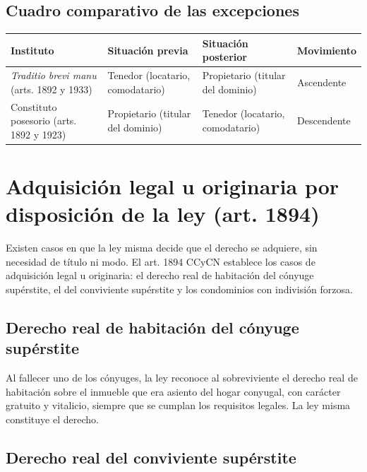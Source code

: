 \documentclass[12pt,oneside]{book}
\begin{document}
\subsection{Cuadro comparativo de las excepciones}

\begin{center}
\small
\renewcommand{\arraystretch}{1.3}
\begin{tabularx}{\textwidth}{@{}>{\raggedright\arraybackslash}p{}>{\raggedright\arraybackslash}X>{\raggedright\arraybackslash}X>{\raggedright\arraybackslash}p{}@{}}
\toprule
\textbf{Instituto} & \textbf{Situación previa} & \textbf{Situación posterior} & \textbf{Movimiento} \\
\midrule
\textit{Traditio brevi manu} (arts. 1892 y 1933) & Tenedor (locatario, comodatario) & Propietario (titular del dominio) & Ascendente \\
Constituto posesorio (arts. 1892 y 1923) & Propietario (titular del dominio) & Tenedor (locatario, comodatario) & Descendente \\
\bottomrule
\end{tabularx}
\end{center}

\section{Adquisición legal u originaria por disposición de la ley (art. 1894)}

Existen casos en que la ley misma decide que el derecho se adquiere, sin necesidad de título ni modo. El art. 1894 CCyCN establece los casos de adquisición legal u originaria: el derecho real de habitación del cónyuge supérstite, el del conviviente supérstite y los condominios con indivisión forzosa.

\subsection{Derecho real de habitación del cónyuge supérstite}

Al fallecer uno de los cónyuges, la ley reconoce al sobreviviente el derecho real de habitación sobre el inmueble que era asiento del hogar conyugal, con carácter gratuito y vitalicio, siempre que se cumplan los requisitos legales. La ley misma constituye el derecho.

\subsection{Derecho real del conviviente supérstite}
\end{document}
